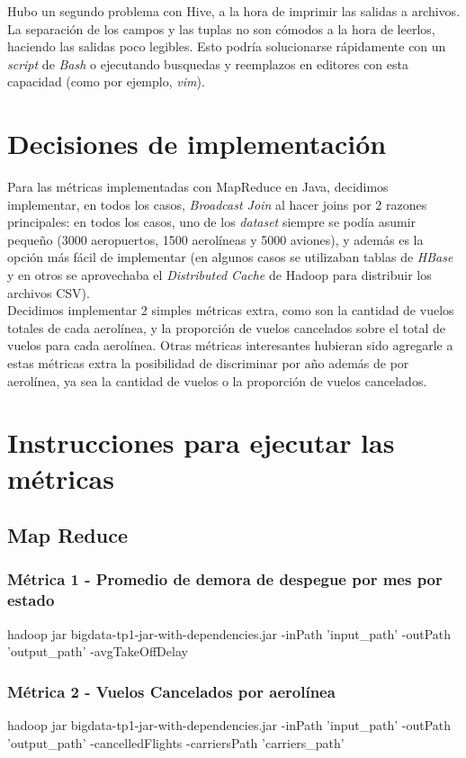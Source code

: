 \documentclass[a4paper,10pt]{article}
\begin{document}
Hubo un segundo problema con Hive, a la hora de imprimir las salidas a archivos. La separación de los campos y las tuplas no son cómodos a la hora de leerlos, haciendo las salidas poco legibles. Esto podría solucionarse rápidamente con un \textit{script} de \textit{Bash} o ejecutando busquedas y reemplazos en editores con esta capacidad (como por ejemplo, \textit{vim}).

\section{Decisiones de implementación}

Para las métricas implementadas con MapReduce en Java, decidimos implementar, en todos los casos, \textit{Broadcast Join} al hacer joins por 2 razones principales: en todos los casos,
uno de los \textit{dataset} siempre se podía asumir pequeño (3000 aeropuertos, 1500 aerolíneas y 5000 aviones), y además es la opción más fácil de implementar (en algunos casos se
utilizaban tablas de \textit{HBase} y en otros se aprovechaba el \textit{Distributed Cache} de Hadoop para distribuir los archivos CSV).\\

Decidimos implementar 2 simples métricas extra, como son la cantidad de vuelos totales de cada aerolínea, y la proporción de vuelos cancelados sobre el total de vuelos para cada
aerolínea. Otras métricas interesantes hubieran sido agregarle a estas métricas extra la posibilidad de discriminar por año además de por aerolínea, ya sea la cantidad de vuelos
o la proporción de vuelos cancelados.

\section{Instrucciones para ejecutar las métricas}

    \subsection{Map Reduce}
        \subsubsection{Métrica 1 - Promedio de demora de despegue por mes por estado}
            \scriptsize{hadoop jar bigdata-tp1-jar-with-dependencies.jar -inPath 'input\_path' -outPath 'output\_path' -avgTakeOffDelay}
        \subsubsection{Métrica 2 - Vuelos Cancelados por aerolínea}
            \scriptsize{hadoop jar bigdata-tp1-jar-with-dependencies.jar -inPath 'input\_path' -outPath 'output\_path' -cancelledFlights -carriersPath 'carriers\_path'}
\end{document}
